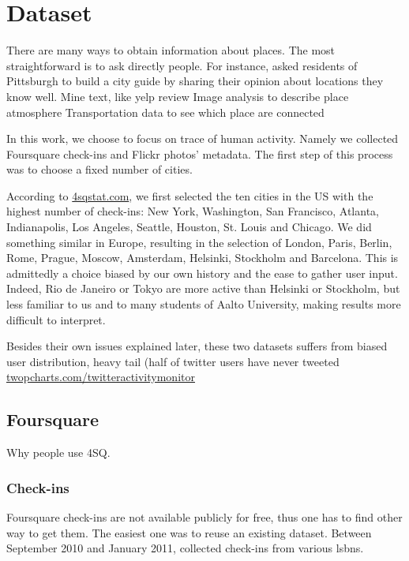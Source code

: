 \chapter{Dataset}
\label{chap:dataset}

There are many ways to obtain information about places. The most
straightforward is to ask directly people. For instance, \textcite{Curated14}
 asked residents of Pittsburgh to build a city
guide by sharing their opinion about locations they know well.
Mine text, like yelp review \autocite{YelpReview14}
Image analysis to describe place atmosphere
Transportation data to see which place are connected

In this work, we choose to focus on trace of human activity. Namely we
collected Foursquare check-ins and Flickr photos' metadata. The first step of
this process was to choose a fixed number of cities.

According to \href{http://www.4sqstat.com/}{4sqstat.com}, we first selected
the ten cities in the US with the highest number of check-ins: New York,
Washington, San Francisco, Atlanta, Indianapolis, Los Angeles, Seattle,
Houston, St. Louis and Chicago. We did something similar in Europe,
resulting in the selection of London, Paris, Berlin, Rome, Prague, Moscow,
Amsterdam, Helsinki, Stockholm and Barcelona. This is admittedly a choice
biased by our own history and the ease to gather user input. Indeed, Rio
de Janeiro or Tokyo are more active than Helsinki or Stockholm, but less
familiar to us and to many students of Aalto University, making results more
difficult to interpret.

Besides their own issues explained later, these two datasets suffers from
biased user distribution\autocite{Weird10}, heavy tail (half of twitter users
have never tweeted \href{http://twopcharts.com/twitteractivitymonitor}%
{\url{twopcharts.com/twitteractivitymonitor}}

\section{Foursquare}

Why people use 4SQ\autocite{FSMotivation11}.

\subsection{Check-ins}

Foursquare check-ins are not available publicly for free, thus one has to
find other way to get them. The easiest one was to reuse an existing dataset.
Between September 2010 and January 2011, \textcite{dataset11} collected
 check-ins  from various \glspl{lsbn}.

